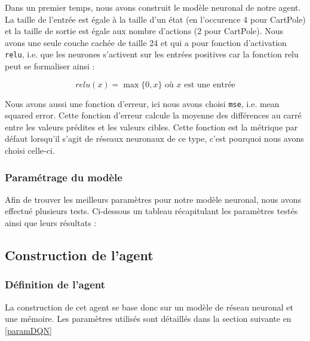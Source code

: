 \documentclass[10pt,a4paper]{article}
\begin{document}
Dans un premier temps, nous avons construit le modèle neuronal de notre agent. La taille de l'entrée est égale à la taille d'un état (en l'occurence 4 pour CartPole) et la taille de sortie est égale aux nombre d'actions (2 pour CartPole). Nous avons une seule couche cachée de taille 24 et qui a pour fonction d'activation \lstinline{relu}, i.e. que les neurones s'activent sur les entrées positives car la fonction relu peut se formaliser ainsi :

$$relu(x) = \max \{0, x\} \text{ où } x \text{ est une entrée}$$

Nous avons aussi une fonction d'erreur, ici nous avons choisi \lstinline{mse}, i.e. mean squared error. Cette fonction d'erreur calcule la moyenne des différences au carré entre les valeurs prédites et les valeurs cibles. Cette fonction est la métrique par défaut lorsqu'il s'agit de réseaux neuronaux de ce type, c'est pourquoi nous avons choisi celle-ci.

\subsubsection{Paramétrage du modèle}

Afin de trouver les meilleurs paramètres pour notre modèle neuronal, nous avons effectué plusieurs tests. Ci-dessous un tableau récapitulant les paramètres testés ainsi que leurs résultats :


\subsection{Construction de l'agent}\label{dqn}

\subsubsection{Définition de l'agent}

La construction de cet agent se base donc sur un modèle de réseau neuronal et une mémoire. Les paramètres utilisés sont détaillés dans la section suivante en \ref{paramDQN}
\end{document}
